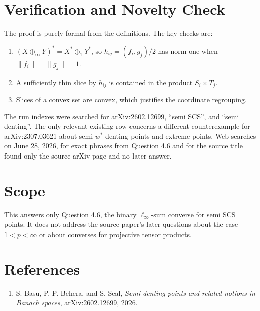\documentclass[11pt]{article}
\begin{document}
\section*{Verification and Novelty Check}

The proof is purely formal from the definitions. The key checks are:
\begin{enumerate}
\item $(X\oplus_\infty Y)^*=X^*\oplus_1Y^*$, so
$h_{ij}=(f_i,g_j)/2$ has norm one when $\|f_i\|=\|g_j\|=1$.
\item A sufficiently thin slice by $h_{ij}$ is contained in the product
$S_i\times T_j$.
\item Slices of a convex set are convex, which justifies the coordinate
regrouping.
\end{enumerate}

The run indexes were searched for arXiv:2602.12699, ``semi SCS'', and
``semi denting''. The only relevant existing row concerns a different
counterexample for arXiv:2307.03621 about semi $w^*$-denting points and
extreme points. Web searches on June 28, 2026, for exact phrases from Question
4.6 and for the source title found only the source arXiv page and no later
answer.

\section*{Scope}

This answers only Question 4.6, the binary $\ell_\infty$-sum converse for
semi SCS points. It does not address the source paper's later questions about
the case $1<p<\infty$ or about converses for projective tensor products.

\section*{References}

\begin{enumerate}
\item S. Basu, P. P. Behera, and S. Seal,
\emph{Semi denting points and related notions in Banach spaces},
arXiv:2602.12699, 2026.
\end{enumerate}
\end{document}
